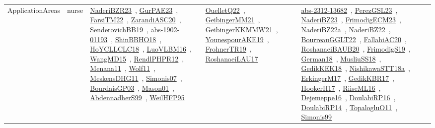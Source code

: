 {\begin{longtable}{lp{3cm}>{\raggedright\arraybackslash}p{6cm}>{\raggedright\arraybackslash}p{6cm}>{\raggedright\arraybackslash}p{8cm}}
\index{nurse}\index{ApplicationAreas!nurse}ApplicationAreas & nurse & \href{../works/NaderiBZR23.pdf}{NaderiBZR23}~\cite{NaderiBZR23}, \href{../works/GurPAE23.pdf}{GurPAE23}~\cite{GurPAE23}, \href{../works/FarsiTM22.pdf}{FarsiTM22}~\cite{FarsiTM22}, \href{../works/ZarandiASC20.pdf}{ZarandiASC20}~\cite{ZarandiASC20}, \href{../works/SenderovichBB19.pdf}{SenderovichBB19}~\cite{SenderovichBB19}, \href{../works/abs-1902-01193.pdf}{abs-1902-01193}~\cite{abs-1902-01193}, \href{../works/ShinBBHO18.pdf}{ShinBBHO18}~\cite{ShinBBHO18}, \href{../works/HoYCLLCLC18.pdf}{HoYCLLCLC18}~\cite{HoYCLLCLC18}, \href{../works/LuoVLBM16.pdf}{LuoVLBM16}~\cite{LuoVLBM16}, \href{../works/WangMD15.pdf}{WangMD15}~\cite{WangMD15}, \href{../works/RendlPHPR12.pdf}{RendlPHPR12}~\cite{RendlPHPR12}, \href{../works/Menana11.pdf}{Menana11}~\cite{Menana11}, \href{../works/Wolf11.pdf}{Wolf11}~\cite{Wolf11}, \href{../works/MeskensDHG11.pdf}{MeskensDHG11}~\cite{MeskensDHG11}, \href{../works/Simonis07.pdf}{Simonis07}~\cite{Simonis07}, \href{../works/BourdaisGP03.pdf}{BourdaisGP03}~\cite{BourdaisGP03}, \href{../works/Mason01.pdf}{Mason01}~\cite{Mason01}, \href{../works/AbdennadherS99.pdf}{AbdennadherS99}~\cite{AbdennadherS99}, \href{../works/WeilHFP95.pdf}{WeilHFP95}~\cite{WeilHFP95} & \href{../works/OuelletQ22.pdf}{OuelletQ22}~\cite{OuelletQ22}, \href{../works/GeibingerMM21.pdf}{GeibingerMM21}~\cite{GeibingerMM21}, \href{../works/GeibingerKKMMW21.pdf}{GeibingerKKMMW21}~\cite{GeibingerKKMMW21}, \href{../works/YounespourAKE19.pdf}{YounespourAKE19}~\cite{YounespourAKE19}, \href{../works/FrohnerTR19.pdf}{FrohnerTR19}~\cite{FrohnerTR19}, \href{../works/RoshanaeiLAU17.pdf}{RoshanaeiLAU17}~\cite{RoshanaeiLAU17} & \href{../works/abs-2312-13682.pdf}{abs-2312-13682}~\cite{abs-2312-13682}, \href{../works/PerezGSL23.pdf}{PerezGSL23}~\cite{PerezGSL23}, \href{../works/NaderiBZ23.pdf}{NaderiBZ23}~\cite{NaderiBZ23}, \href{../works/FrimodigECM23.pdf}{FrimodigECM23}~\cite{FrimodigECM23}, \href{../works/NaderiBZ22a.pdf}{NaderiBZ22a}~\cite{NaderiBZ22a}, \href{../works/NaderiBZ22.pdf}{NaderiBZ22}~\cite{NaderiBZ22}, \href{../works/BourreauGGLT22.pdf}{BourreauGGLT22}~\cite{BourreauGGLT22}, \href{../works/FallahiAC20.pdf}{FallahiAC20}~\cite{FallahiAC20}, \href{../works/RoshanaeiBAUB20.pdf}{RoshanaeiBAUB20}~\cite{RoshanaeiBAUB20}, \href{../works/FrimodigS19.pdf}{FrimodigS19}~\cite{FrimodigS19}, \href{../works/German18.pdf}{German18}~\cite{German18}, \href{../works/MusliuSS18.pdf}{MusliuSS18}~\cite{MusliuSS18}, \href{../works/GedikKEK18.pdf}{GedikKEK18}~\cite{GedikKEK18}, \href{../works/NishikawaSTT18a.pdf}{NishikawaSTT18a}~\cite{NishikawaSTT18a}, \href{../works/ErkingerM17.pdf}{ErkingerM17}~\cite{ErkingerM17}, \href{../works/GedikKBR17.pdf}{GedikKBR17}~\cite{GedikKBR17}, \href{../works/HookerH17.pdf}{HookerH17}~\cite{HookerH17}, \href{../works/RiiseML16.pdf}{RiiseML16}~\cite{RiiseML16}, \href{../works/Dejemeppe16.pdf}{Dejemeppe16}~\cite{Dejemeppe16}, \href{../works/DoulabiRP16.pdf}{DoulabiRP16}~\cite{DoulabiRP16}, \href{../works/DoulabiRP14.pdf}{DoulabiRP14}~\cite{DoulabiRP14}, \href{../works/TopalogluO11.pdf}{TopalogluO11}~\cite{TopalogluO11}, \href{../works/Simonis99.pdf}{Simonis99}~\cite{Simonis99}\\

\end{longtable}}
